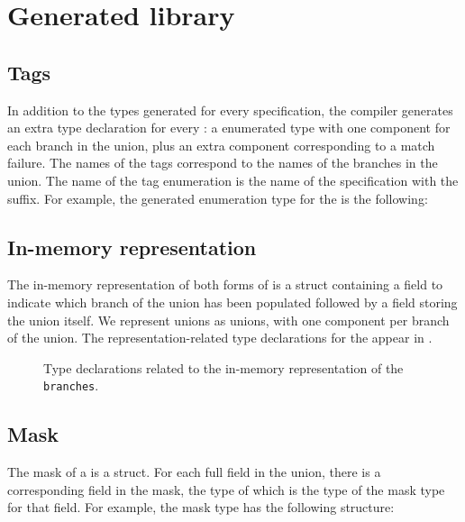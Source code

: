\section{Generated library}
\subsection{Tags}
\label{sec:unions-tags}
In addition to the types generated for every \pads{} specification,
the \pads{} compiler generates an extra type 
declaration for every \Punion{}: a enumerated type with one component
for each branch in the union, plus an extra component corresponding to
a match failure.  The names of the tags correspond to the names of the
branches in the union.  The name of the tag enumeration is the name of
the \pads{} specification with the  suffix.
For example, the generated enumeration type
for the \Punion{}  is the following:

%


\subsection{In-memory representation}
\label{sec:unions-rep}
The in-memory representation of both forms of \Punion{} is 
a \C{} struct containing a  field to indicate which branch of the
union has been populated followed by a  field storing the union
itself.  We represent unions as \C{} unions, with one component per
branch of the union.  
The representation-related type declarations for
the \Punion{}  appear in .

\begin{figure}

\caption{Type declarations related to the in-memory representation of
  the \Punion{} \texttt{branches}.}
\label{fig:punion-rep}
\end{figure}

\subsection{Mask}
\label{sec:unions-masks}
The mask of a \Punion{} is a \C{} struct.  
For each full field in the union,
there is a corresponding field in the mask, the type of which is the
type of the mask type for that field.   For example, the mask type
 has the following structure:


